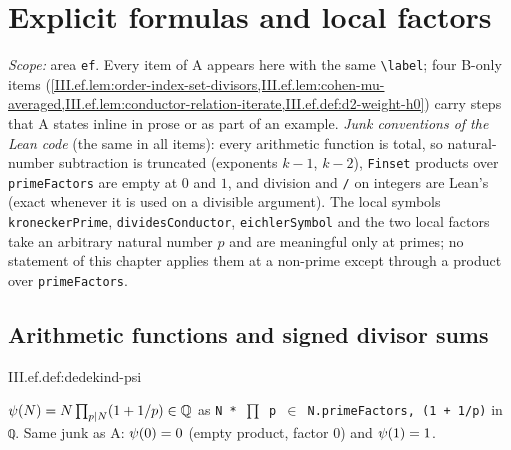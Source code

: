 \chapter{Explicit formulas and local factors}\label{ch:ch-iii-01-explicit}

\noindent\emph{Scope:} area \texttt{ef}. Every item of A appears here with the same \texttt{\textbackslash label};
four B-only items (\cref{III.ef.lem:order-index-set-divisors,III.ef.lem:cohen-mu-averaged,III.ef.lem:conductor-relation-iterate,III.ef.def:d2-weight-h0})
carry steps that A states inline in prose or as part of an example.
\emph{Junk conventions of the Lean code} (the same in all items): every arithmetic function is total, so natural-number subtraction is truncated
(exponents $k-1$, $k-2$), \texttt{Finset} products over \texttt{primeFactors} are empty at $0$ and $1$, and division and \texttt{/} on integers are Lean's
(exact whenever it is used on a divisible argument). The local symbols \texttt{kroneckerPrime}, \texttt{dividesConductor}, \texttt{eichlerSymbol} and the two local factors
take an arbitrary natural number $p$ and are meaningful only at primes; no statement of this chapter applies them at a non-prime except through a
product over \texttt{primeFactors}.
\section{Arithmetic functions and signed divisor sums}\label{sec:ef-arith}

\begin{definition}
\end{definition}
\begin{tfformal}{III.ef.def:dedekind-psi}
\begin{tffidelity}
$\psi(N)=N\prod_{p\mid N}(1+1/p)\in\mathbb{Q}$ as \texttt{N * \(\prod\) p \(\in\) N.primeFactors, (1 + 1/p)} in \texttt{ℚ}. Same junk as A: $\psi(0)=0$ (empty product, factor $0$) and $\psi(1)=1$.
\end{tffidelity}
\end{tfformal}

